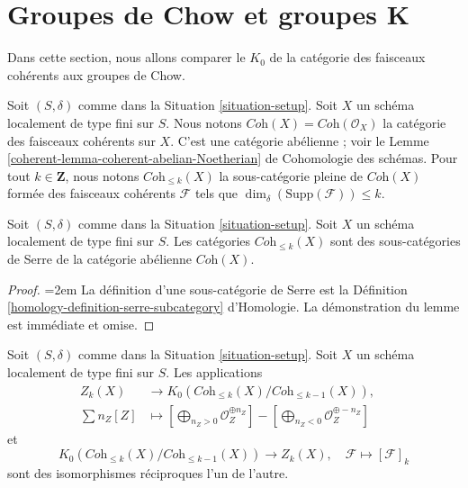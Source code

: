 \section{Groupes de Chow et groupes K}
\label{section-chow-and-K}

\noindent
Dans cette section, nous allons comparer le $K_0$ de la
catégorie des faisceaux cohérents aux groupes de Chow.

\medskip\noindent
Soit $(S, \delta)$ comme dans la Situation \ref{situation-setup}.
Soit $X$ un schéma localement de type fini sur $S$.
Nous notons $\textit{Coh}(X) = \textit{Coh}(\mathcal{O}_X)$
la catégorie des faisceaux cohérents sur $X$.
C'est une catégorie abélienne ; voir le
Lemme \ref{coherent-lemma-coherent-abelian-Noetherian} de Cohomologie des schémas.
Pour tout $k \in \mathbf{Z}$, nous notons $\textit{Coh}_{\leq k}(X)$
la sous-catégorie pleine de $\textit{Coh}(X)$
formée des faisceaux cohérents $\mathcal{F}$
tels que $\dim_\delta(\text{Supp}(\mathcal{F})) \leq k$.

\begin{lemma}
\label{lemma-Serre-subcategories}
Soit $(S, \delta)$ comme dans la Situation \ref{situation-setup}.
Soit $X$ un schéma localement de type fini sur $S$.
Les catégories $\textit{Coh}_{\leq k}(X)$ sont des sous-catégories de Serre
de la catégorie abélienne $\textit{Coh}(X)$.
\end{lemma}

\begin{proof}
{\emergencystretch=2em La définition d'une sous-catégorie de Serre est la
Définition \ref{homology-definition-serre-subcategory} d'Homologie.
La démonstration du lemme est immédiate et omise.\par}
\end{proof}

\begin{lemma}
\label{lemma-cycles-k-group}
Soit $(S, \delta)$ comme dans la Situation \ref{situation-setup}.
Soit $X$ un schéma localement de type fini sur $S$.
Les applications
$$
\begin{aligned}
Z_k(X)
&\longrightarrow
K_0(\textit{Coh}_{\leq k}(X)/\textit{Coh}_{\leq k - 1}(X)),
\quad \\
\sum n_Z[Z] &\mapsto
\left[\bigoplus\nolimits_{n_Z > 0} \mathcal{O}_Z^{\oplus n_Z}\right]
-
\left[\bigoplus\nolimits_{n_Z < 0} \mathcal{O}_Z^{\oplus -n_Z}\right]
\end{aligned}
$$
et
$$
K_0(\textit{Coh}_{\leq k}(X)/\textit{Coh}_{\leq k - 1}(X))
\longrightarrow
Z_k(X),\quad
\mathcal{F} \longmapsto [\mathcal{F}]_k
$$
sont des isomorphismes réciproques l'un de l'autre.
\end{lemma}

